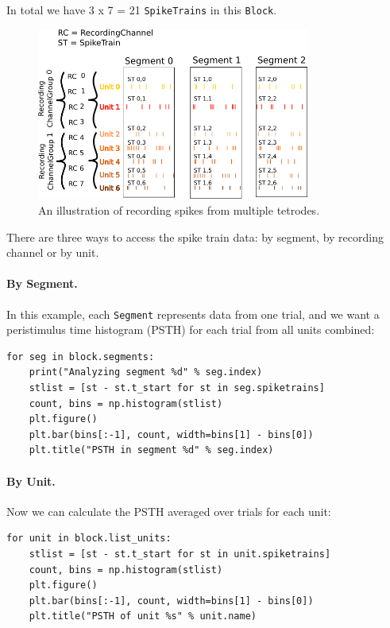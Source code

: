 \documentclass{frontiers}
\begin{document}
In total we have 3 x 7 = 21 \lstinline`SpikeTrains` in this \lstinline`Block`.

\begin{figure}
\centering
\includegraphics[width=0.8\textwidth]{figures/usecase2}
\caption{An illustration of recording spikes from multiple tetrodes.}\label{fig:usecase2} 
\end{figure}

There are three ways to access the spike train data: by segment, by recording channel or by unit.

\paragraph{By Segment.}
In this example, each \lstinline`Segment` represents data from one trial, and we want a peristimulus time histogram (PSTH) for each trial from all units combined:

\begin{lstlisting}[style=display]
for seg in block.segments:
    print("Analyzing segment %d" % seg.index)
    stlist = [st - st.t_start for st in seg.spiketrains]
    count, bins = np.histogram(stlist)
    plt.figure()
    plt.bar(bins[:-1], count, width=bins[1] - bins[0])
    plt.title("PSTH in segment %d" % seg.index)
\end{lstlisting}

\paragraph{By Unit.}
Now we can calculate the PSTH averaged over trials for each unit:

\begin{lstlisting}[style=display]
for unit in block.list_units:
    stlist = [st - st.t_start for st in unit.spiketrains]
    count, bins = np.histogram(stlist)
    plt.figure()
    plt.bar(bins[:-1], count, width=bins[1] - bins[0])
    plt.title("PSTH of unit %s" % unit.name)
\end{lstlisting}
\end{document}
